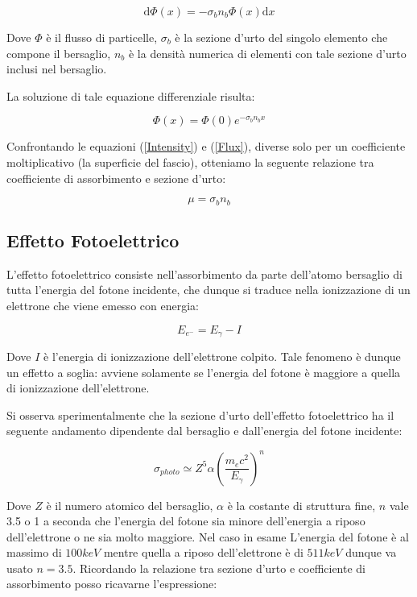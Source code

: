 \begin{equation}
\mathrm{d}\Phi(x)=-\sigma_{b}n_{b}\Phi(x)\mathrm{d}x
\end{equation}

Dove $\Phi$ è il flusso di particelle, $\sigma_{b}$ è la sezione d'urto del singolo elemento che compone il bersaglio, $n_b$ è la densità numerica di elementi con tale sezione d'urto inclusi nel bersaglio.

La soluzione di tale equazione differenziale risulta:

\begin{equation}
\Phi(x)=\Phi(0)e^{-\sigma_{b}n_{b}x}
\label{Flux}
\end{equation}

Confrontando le equazioni (\ref{Intensity}) e (\ref{Flux}), diverse solo per un coefficiente moltiplicativo (la superficie del fascio), otteniamo la seguente relazione tra coefficiente di assorbimento e sezione d'urto:

\begin{equation}
\mu=\sigma_{b} n_{b}
\end{equation}

\subsection{Effetto Fotoelettrico}

L'effetto fotoelettrico consiste nell'assorbimento da parte dell'atomo bersaglio di tutta l'energia del fotone incidente, che dunque si traduce nella ionizzazione di un elettrone che viene emesso con energia:

\begin{equation}
E_{e^-}=E_{\gamma}-I
\end{equation}

Dove $I$ è l'energia di ionizzazione dell'elettrone colpito. Tale fenomeno è dunque un effetto a soglia: avviene solamente se l'energia del fotone è maggiore a quella di ionizzazione dell'elettrone.

Si osserva sperimentalmente che la sezione d'urto dell'effetto fotoelettrico ha il seguente andamento dipendente dal bersaglio e dall'energia del fotone incidente:

\begin{equation}
\sigma_{photo}\simeq Z^5\alpha(\frac{m_{e}c^2}{E_{\gamma}})^n
\end{equation}

Dove $Z$ è il numero atomico del bersaglio, $\alpha$ è la costante di struttura fine, $n$ vale 3.5 o 1 a seconda che l'energia del fotone sia minore dell'energia a riposo dell'elettrone o ne sia molto maggiore. Nel caso in esame L'energia del fotone è al massimo di $100 keV$ mentre quella a riposo dell'elettrone è di $511 keV$ dunque va usato $n=3.5$.
Ricordando la relazione tra sezione d'urto e coefficiente di assorbimento posso ricavarne l'espressione:

